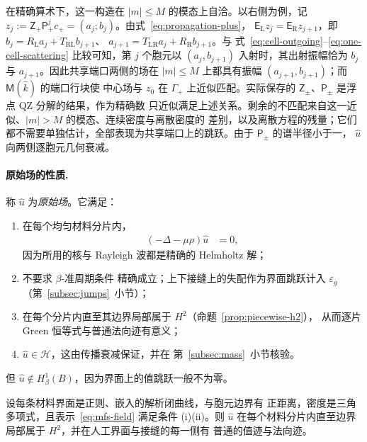 在精确算术下，这一构造在 $|m|\leq M$ 的模态上自洽。以右侧为例，记
$z_j:=\mathsf Z_+\mathsf P_+^jc_+=(a_j;b_j)$。由式~\eqref{eq:propagation-plus}，
$\mathsf E_{\mathrm L}z_j=\mathsf E_{\mathrm R}z_{j+1}$，即
$b_j=R_{\mathrm L}a_j+T_{\mathrm{RL}}b_{j+1}$、
$a_{j+1}=T_{\mathrm{LR}}a_j+R_{\mathrm R}b_{j+1}$。与
式~\eqref{eq:cell-outgoing}--\eqref{eq:one-cell-scattering} 比较可知，第 $j$ 个胞元以
$(a_j,b_{j+1})$ 入射时，其出射振幅恰为 $b_j$ 与 $a_{j+1}$。因此共享端口两侧的场在
$|m|\leq M$ 上都具有振幅 $(a_{j+1},b_{j+1})$；而 $\mathsf M(\widehat k)$ 的端口行块使
中心场与 $z_0$ 在 $\Gamma_+$ 上近似匹配。实际保存的 $\mathsf Z_\pm$、$\mathsf P_\pm$ 是浮点 QZ 分解的结果，作为精确数
只近似满足上述关系。剩余的不匹配来自这一近似、$|m|>M$ 的模态、连续密度与离散密度的
差别，以及离散方程的残量；它们都不需要单独估计，全部表现为共享端口上的跳跃。由于 $\mathsf P_\pm$ 的谱半径小于一，
$\widehat u$ 向两侧逐胞元几何衰减。

\paragraph{原始场的性质.}
称 $\widehat u$ 为\emph{原始场}。它满足：
\begin{enumerate}
  \item[(P1)] 在每个均匀材料分片内，
    \begin{align}
      (-\Delta-\mu\rho)\widehat u&=0,
      \label{eq:raw-piecewise-pde}
    \end{align}
    因为所用的核与 Rayleigh 波都是精确的 Helmholtz 解；
  \item[(P2)] 不要求 $\beta$-准周期条件
    精确成立；上下接缝上的失配作为界面跳跃计入 $\varepsilon_g$
    （第~\ref{subsec:jumps}~小节）；
  \item[(P3)] 在每个分片内直至其边界局部属于 $H^2$（命题~\ref{prop:piecewise-h2}），
    从而逐片 Green 恒等式与普通法向迹有意义；
  \item[(P4)] $\widehat u\in\mathcal H$，这由传播衰减保证，并在
    第~\ref{subsec:mass}~小节核验。
\end{enumerate}
但 $\widehat u\notin H^1_\beta(B)$，因为界面上的值跳跃一般不为零。

\begin{proposition}[逐片 $H^2$ 正则性]
  \label{prop:piecewise-h2}
  设每条材料界面是正则、嵌入的解析闭曲线，与胞元边界有
  正距离，密度是三角多项式，且表示~\eqref{eq:mfs-field} 满足条件 (i)(ii)。则
  $\widehat u$ 在每个材料分片内直至边界局部属于 $H^2$，并在人工界面与接缝的每一侧有
  普通的值迹与法向迹。
\end{proposition}

